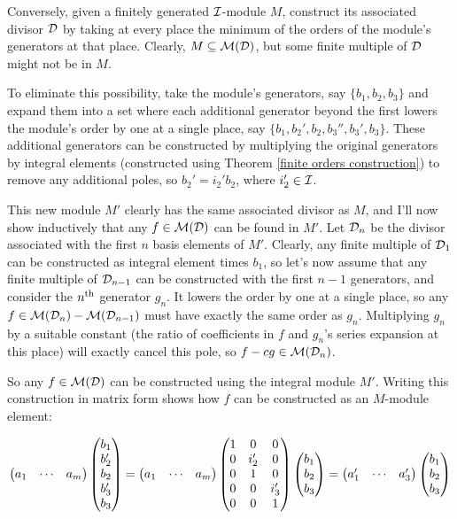 Conversely, given a finitely generated ${\cal I}$-module $M$,
construct its associated divisor ${\cal D}$ by taking at every place
the minimum of the orders of the module's generators at that place.
Clearly, $M \subseteq {\cal M}({\cal D})$, but some finite multiple of
${\cal D}$ might not be in $M$.

To eliminate this possibility, take the module's generators, say
$\{b_1, b_2, b_3\}$ and expand them into a set where each additional
generator beyond the first lowers the module's order by one at a
single place, say $\{b_1, b_2', b_2, b_3'', b_3', b_3\}$.  These
additional generators can be constructed by multiplying the original
generators by integral elements (constructed using Theorem \ref{finite
orders construction}) to remove any additional poles, so $b_2' = i_2'
b_2$, where $i_2' \in {\cal I}$.

This new module $M'$ clearly has the same associated divisor as $M$,
and I'll now show inductively that any $f \in {\cal M}({\cal D})$ can
be found in $M'$.  Let ${\cal D}_n$ be the divisor associated with the
first $n$ basis elements of $M'$.  Clearly, any finite multiple of
${\cal D}_1$ can be constructed as integral element times $b_1$, so
let's now assume that any finite multiple of ${\cal D}_{n-1}$ can be
constructed with the first $n-1$ generators, and consider the $n^{\rm
th}$ generator $g_n$.  It lowers the order by one at a single place,
so any $f \in {\cal M}({\cal D}_n) - {\cal M}({\cal D}_{n-1})$ must
have exactly the same order as $g_n$.  Multiplying $g_n$ by a suitable
constant (the ratio of coefficients in $f$ and $g_n$'s series
expansion at this place) will exactly cancel this pole, so $f - cg \in
{\cal M}({\cal D}_n)$.

So any $f \in {\cal M}({\cal D})$ can be constructed using the
integral module $M'$.  Writing this construction in matrix form
shows how $f$ can be constructed as an $M$-module element:

$$\begin{pmatrix}a_1 & \cdots & a_m\end{pmatrix} \begin{pmatrix}b_1 \cr b_2' \cr b_2 \cr b_3' \cr b_3\end{pmatrix}
= \begin{pmatrix}a_1 & \cdots & a_m\end{pmatrix}\begin{pmatrix}1 & 0 & 0 \cr 0 & i_2' & 0 \cr 0 & 1 & 0 \cr 0 & 0 & i_3' \cr 0 & 0 &1\end{pmatrix}\begin{pmatrix}b_1 \cr b_2 \cr b_3\end{pmatrix}
= \begin{pmatrix}a_1' & \cdots & a_3'\end{pmatrix}\begin{pmatrix}b_1 \cr b_2 \cr b_3\end{pmatrix}
$$


